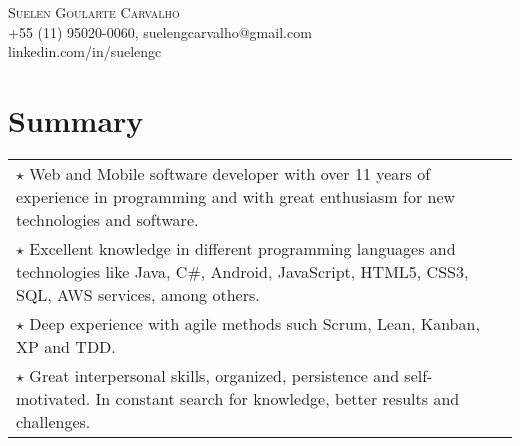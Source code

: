 \documentclass[a4paper, oneside, final]{scrartcl}
\newcommand{\vspc}{\vspace{0.15cm}} %
\begin{document}
\begin{center}
\textsc{\Huge{Suelen Goularte Carvalho}} \vspc\\
{\small +55 (11) 95020-0060, suelengcarvalho@gmail.com} \vspc\\
{\small linkedin.com/in/suelengc}






\section{Summary}
\begin{tabularx}{1\linewidth}{X}
	$\star$ Web and Mobile software developer with over 11 years of experience in programming and with great enthusiasm for new technologies and software. \vspc\\

	$\star$ Excellent knowledge in different programming languages and technologies like Java, C\#, Android, JavaScript, HTML5, CSS3, SQL, AWS services, among others. \vspc\\

	$\star$ Deep experience with agile methods such Scrum, Lean, Kanban, XP and TDD.\vspc\\

	$\star$ Great interpersonal skills, organized, persistence and self-motivated. In constant search for knowledge, better results and challenges. \vspc\\
	

\end{tabularx}
\end{center}
\end{document}
